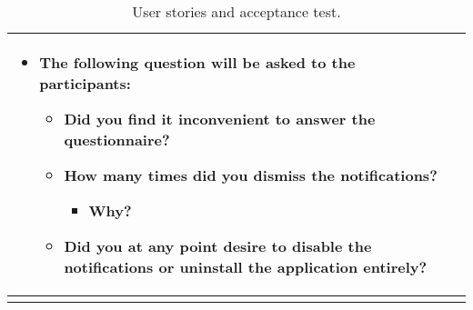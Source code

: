 \begin{center}
\begin{longtable}{| m{} | m{} |}
\begin{itemize}
	 	\item The following question will be asked to the participants:
	 		\begin{itemize}
	 			\item Did you find it inconvenient to answer the questionnaire?
				\item How many times did you dismiss the notifications?
					\begin{itemize}
						\item Why?
					\end{itemize}
				\item Did you at any point desire to disable the notifications or uninstall the application entirely?
	 		\end{itemize}
	 \end{itemize}
	 \\ \hline
\caption{User stories and acceptance test.}
\label{tab:user_stories_and_acceptance_test}
\end{longtable}
\end{center}


